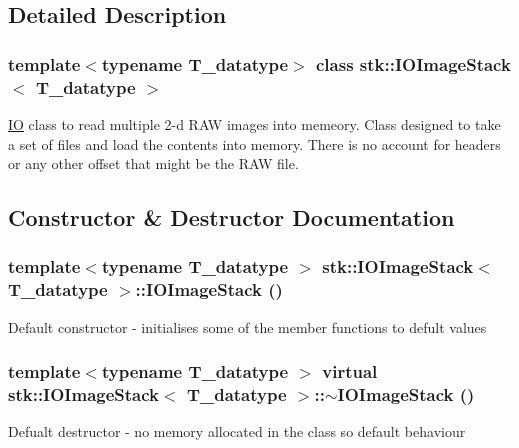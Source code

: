 \subsection{Detailed Description}
\subsubsection*{template$<$typename T\_\-datatype$>$ class stk::IOImageStack$<$ T\_\-datatype $>$}

\hyperlink{classstk_1_1IO}{IO} class to read multiple 2-\/d RAW images into memeory. Class designed to take a set of files and load the contents into memory. There is no account for headers or any other offset that might be the RAW file. 

\subsection{Constructor \& Destructor Documentation}
\hypertarget{classstk_1_1IOImageStack_a6ffc3e1c1954bf3b09f42ced9f645743}{
\subsubsection[{IOImageStack}]{\setlength{\rightskip}{0pt plus 5cm}template$<$typename T\_\-datatype $>$ {\bf stk::IOImageStack}$<$ T\_\-datatype $>$::{\bf IOImageStack} ()}}
\label{classstk_1_1IOImageStack_a6ffc3e1c1954bf3b09f42ced9f645743}
Default constructor -\/ initialises some of the member functions to defult values \hypertarget{classstk_1_1IOImageStack_a802c8497a1ae2c74db74ccfacae8f128}{
\subsubsection[{$\sim$IOImageStack}]{\setlength{\rightskip}{0pt plus 5cm}template$<$typename T\_\-datatype $>$ virtual {\bf stk::IOImageStack}$<$ T\_\-datatype $>$::$\sim${\bf IOImageStack} ()}}
\label{classstk_1_1IOImageStack_a802c8497a1ae2c74db74ccfacae8f128}
Defualt destructor -\/ no memory allocated in the class so default behaviour 

